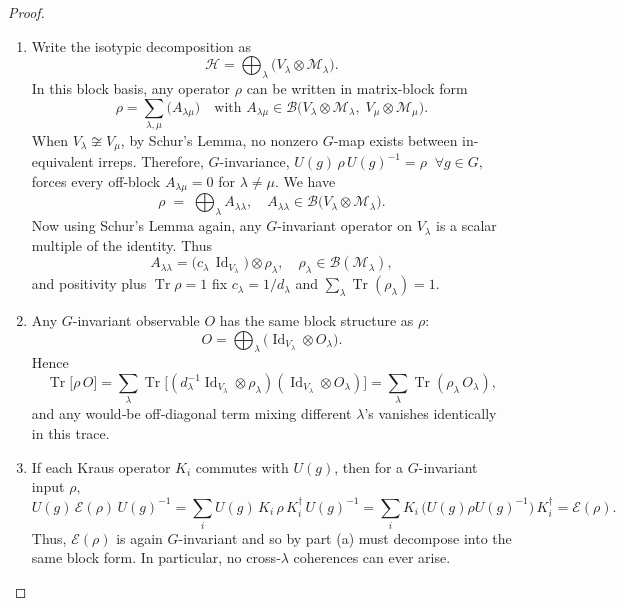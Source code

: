 \documentclass[12pt,a4paper]{article}
\begin{document}
\begin{proof}
	\leavevmode
	\begin{enumerate}[left=1em]
		\item[\textbf{(a)}]
		Write the isotypic decomposition as
		\[
		\mathcal H =
		\bigoplus_{\lambda} \bigl(V_\lambda\otimes\mathcal M_\lambda\bigr).
		\]
		In this block basis, any operator $\rho$ can be written in matrix‐block form
		\[
		\rho = 
		\sum_{\lambda, \mu}
		\bigl(A_{\lambda\mu}\bigr)
		\quad
		\text{with }
		A_{\lambda\mu} \in
		\mathcal B \bigl(V_\lambda \otimes \mathcal M_\lambda,\;V_\mu\otimes\mathcal M_\mu\bigr).
		\]
		When $V_\lambda\not\cong V_\mu$, by Schur’s Lemma, no nonzero $G$-map exists between in-equivalent irreps.
		Therefore, $G$-invariance,
		$
		U(g)\,\rho\,U(g)^{-1}=\rho
		\;\;\forall g\in G,
		$
		forces every off‐block $A_{\lambda\mu}=0$ for $\lambda\neq\mu$.
		We have
		\[
		\rho
		\;=\;
		\bigoplus_{\lambda}
		A_{\lambda\lambda},
		\quad
		A_{\lambda\lambda}
		\in
		\mathcal B \bigl(V_\lambda \otimes \mathcal M_\lambda\bigr).
		\]
		Now using Schur’s Lemma again, any $G$-invariant operator on $V_\lambda$ is a scalar multiple of the identity.
		Thus
		\[
		A_{\lambda\lambda}
		=
		\bigl(c_\lambda\,\operatorname{Id}_{V_\lambda}\bigr)
		\otimes
		\rho_\lambda,
		\quad
		\rho_\lambda\in\mathcal B(\mathcal M_\lambda),
		\]
		and positivity plus $\operatorname{Tr}\rho=1$ fix
		$
		c_\lambda = 1/d_\lambda
		$
		and $\sum_\lambda \operatorname{Tr}(\rho_\lambda) = 1$.
		
		\item[\textbf{(b)}]
		Any $G$-invariant observable $O$ has the same block structure as $\rho$:
		\[
		O
		=
		\bigoplus_\lambda
		\bigl(\operatorname{Id}_{V_\lambda} \otimes O_\lambda\bigr).
		\]
		Hence
		\[
		\operatorname{Tr}\bigl[\rho\,O\bigr]
		=
		\sum_\lambda
		\operatorname{Tr}\!\bigl[
		(d_\lambda^{-1} \operatorname{Id}_{V_\lambda}\otimes\rho_\lambda)
		(\operatorname{Id}_{V_\lambda} \otimes O_\lambda)
		\bigr]
		=
		\sum_\lambda
		\operatorname{Tr}(\rho_\lambda\,O_\lambda),
		\]
		and any would‐be off‐diagonal term mixing different $\lambda$’s vanishes identically in this trace.
		
		\item[\textbf{(c)}]
		If each Kraus operator $K_i$ commutes with $U(g)$, then for a $G$-invariant input $\rho$,
		\[
		U(g)\,\mathcal E(\rho)\,U(g)^{-1}
		= 
		\sum_i
		U(g)\,K_i\,\rho\,K_i^\dagger\,U(g)^{-1}
		=
		\sum_i
		K_i\,\bigl(U(g)\rho U(g)^{-1}\bigr)\,K_i^\dagger
		= 
		\mathcal E(\rho).
		\]
		Thus, $\mathcal E(\rho)$ is again $G$-invariant and so by part (a) must decompose into the same block form.
		In particular, no cross‐$\lambda$ coherences can ever arise.
	\end{enumerate}
\end{proof}
\end{document}
